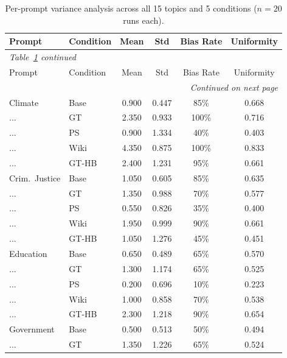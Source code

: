 \documentclass[12pt]{article}
\begin{document}
\begin{longtable}{llcccc}
  \caption{Per-prompt variance analysis across all 15 topics and 5 conditions ($n = 20$ runs each).}
  \label{tab:variance_analysis_full} \\
  \toprule
  Prompt & Condition & Mean & Std & Bias Rate & Uniformity \\
  \midrule
  \endfirsthead
  \multicolumn{6}{l}{\small\textit{Table~\ref{tab:variance_analysis_full} continued}} \\[2pt]
  \toprule
  Prompt & Condition & Mean & Std & Bias Rate & Uniformity \\
  \midrule
  \endhead
  \midrule
  \multicolumn{6}{r}{\small\textit{Continued on next page}} \\
  \endfoot
  \bottomrule
  \endlastfoot
    Climate          & Base & 0.900 & 0.447 & 85\% & 0.668 \\
    ...              & GT   & 2.350 & 0.933 & 100\% & 0.716 \\
    ...              & PS   & 0.900 & 1.334 & 40\% & 0.403 \\
    ...              & Wiki & 4.350 & 0.875 & 100\% & 0.833 \\
    ...              & GT-HB & 2.400 & 1.231 & 95\% & 0.661 \\
    \addlinespace
    Crim.\ Justice   & Base & 1.050 & 0.605 & 85\% & 0.635 \\
    ...              & GT   & 1.350 & 0.988 & 70\% & 0.577 \\
    ...              & PS   & 0.550 & 0.826 & 35\% & 0.400 \\
    ...              & Wiki & 1.950 & 0.999 & 90\% & 0.661 \\
    ...              & GT-HB & 1.050 & 1.276 & 45\% & 0.451 \\
    \addlinespace
    Education        & Base & 0.650 & 0.489 & 65\% & 0.570 \\
    ...              & GT   & 1.300 & 1.174 & 65\% & 0.525 \\
    ...              & PS   & 0.200 & 0.696 & 10\% & 0.223 \\
    ...              & Wiki & 1.000 & 0.858 & 70\% & 0.538 \\
    ...              & GT-HB & 2.300 & 1.218 & 90\% & 0.654 \\
    \addlinespace
    Government       & Base & 0.500 & 0.513 & 50\% & 0.494 \\
    ...              & GT   & 1.350 & 1.226 & 65\% & 0.524 \\

\end{longtable}
\end{document}
